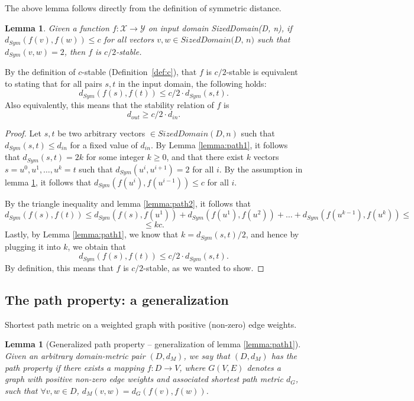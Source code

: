 \documentclass[11pt,a4paper]{article}
\newtheorem{lemma}[theorem]{Lemma}
\theoremstyle{definition}
\newcommand{\din}{d_{in}}
\newcommand{\dout}{d_{out}}
\begin{document}
The above lemma follows directly from the definition of symmetric distance. 

\begin{lemma}\label{lemma:path3}
Given a function $f: \mathcal{X} \rightarrow \mathcal{Y}$ on input domain \textit{SizedDomain(D, n)}, if $d_{Sym}(f(v), f(w)) \leq c$ for all vectors $v, w \in \textit{SizedDomain(D, n)}$ such that $d_{Sym}(v, w) = 2$, then $f$ is $c/2$-stable.
\end{lemma}

By the definition of $c$-stable (Definition~\ref{def:c}), 
that $f$ is $c/2$-stable is equivalent to stating that for all pairs $s, t$ in the input domain, the following holds:
\[
    d_{Sym}(f(s), f(t)) \leq c/2 \cdot d_{Sym}(s, t).
\]
Also equivalently, this means that the stability relation of $f$ is
\[
    \dout \geq c/2 \cdot \din.
\]

\begin{proof}
    Let $s, t$ be two arbitrary vectors $\in SizedDomain(D, n)$ such that $d_{Sym}(s, t) \leq \din$ for a fixed value of $\din$. By Lemma \ref{lemma:path1}, it follows that $d_{Sym}(s, t) = 2k$ for some integer $k \geq 0$, and that there exist $k$ vectors $s = u^0, u^1, \ldots, u^k = t$ such that $d_{Sym}(u^i, u^{i+1}) = 2$ for all $i$. By the assumption in lemma \ref{lemma:path3}, it follows that $d_{Sym}(f(u^i), f(u^{i-1})) \leq c$ for all $i$.
    
    By the triangle inequality and lemma \ref{lemma:path2}, it follows that
    \[
        d_{Sym}(f(s), f(t)) \leq d_{Sym}(f(s), f(u^1)) + d_{Sym}(f(u^1), f(u^2)) + \ldots + d_{Sym}(f(u^{k-1}), f(u^k)) \leq
    \]
    \[
        \leq k c.
    \]
    Lastly, by Lemma \ref{lemma:path1}, we know that $k = d_{Sym}(s, t) / 2$, and hence by plugging it into $k$, we obtain that
    \[
    d_{Sym}(f(s), f(t)) \leq c/2 \cdot d_{Sym}(s, t).
    \]
    By definition, this means that $f$ is $c/2$-stable, as we wanted to show.
\end{proof}

\subsection{The path property: a generalization}
Shortest path metric on a weighted graph with positive (non-zero) edge weights. 

\begin{lemma}[Generalized path property -- generalization of lemma \ref{lemma:path1}]
\label{lemma:path1gen}
    Given an arbitrary domain-metric pair $(D, d_M)$, we say that $(D, d_M)$ has the path property if there exists a mapping $f: D \rightarrow V$, where $G(V, E)$ denotes a graph with  positive non-zero edge weights and associated shortest path metric $d_G$, such that $\forall v, w \in D$, $d_M(v, w) = d_G(f(v), f(w))$.
\end{lemma}
\end{document}
